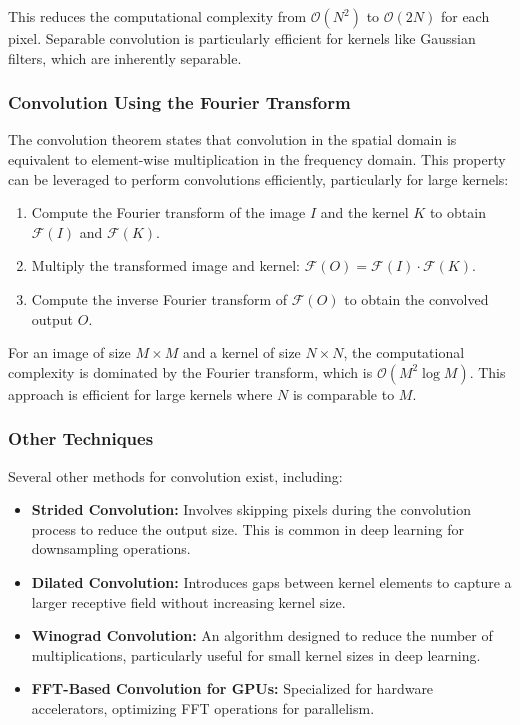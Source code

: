 \documentclass[11pt]{book}
\begin{document}
This reduces the computational complexity from $\mathcal{O}(N^2)$ to $\mathcal{O}(2N)$ for each pixel. Separable convolution is particularly efficient for kernels like Gaussian filters, which are inherently separable.

\subsubsection{Convolution Using the Fourier Transform}
The convolution theorem states that convolution in the spatial domain is equivalent to element-wise multiplication in the frequency domain. This property can be leveraged to perform convolutions efficiently, particularly for large kernels:
\begin{enumerate}
    \item Compute the Fourier transform of the image $I$ and the kernel $K$ to obtain $\mathcal{F}(I)$ and $\mathcal{F}(K)$.
    \item Multiply the transformed image and kernel: $\mathcal{F}(O) = \mathcal{F}(I) \cdot \mathcal{F}(K)$.
    \item Compute the inverse Fourier transform of $\mathcal{F}(O)$ to obtain the convolved output $O$.
\end{enumerate}

For an image of size $M \times M$ and a kernel of size $N \times N$, the computational complexity is dominated by the Fourier transform, which is $\mathcal{O}(M^2 \log M)$. This approach is efficient for large kernels where $N$ is comparable to $M$.

\subsubsection{Other Techniques}
Several other methods for convolution exist, including:
\begin{itemize}
    \item \textbf{Strided Convolution:} Involves skipping pixels during the convolution process to reduce the output size. This is common in deep learning for downsampling operations.
    \item \textbf{Dilated Convolution:} Introduces gaps between kernel elements to capture a larger receptive field without increasing kernel size.
    \item \textbf{Winograd Convolution:} An algorithm designed to reduce the number of multiplications, particularly useful for small kernel sizes in deep learning.
    \item \textbf{FFT-Based Convolution for GPUs:} Specialized for hardware accelerators, optimizing FFT operations for parallelism.
\end{itemize}
\end{document}
